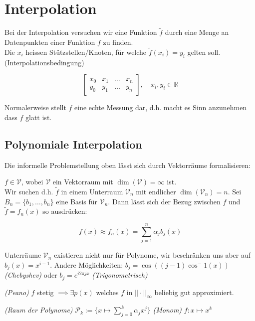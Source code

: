 \newsection
\section{Interpolation}
Bei der Interpolation versuchen wir eine Funktion $\tilde{f}$ durch eine Menge an Datenpunkten einer Funktion $f$ zu finden.\\
Die $x_i$ heissen Stützstellen/Knoten, für welche $\tilde{f}(x_i) = y_i$ gelten soll. (Interpolationsbedingung)

$$ 
\begin{bmatrix}
    x_0 & x_1 & \ldots & x_n \\
    y_0 & y_1 & \ldots & y_n    
\end{bmatrix},
\quad x_i, y_i \in \mathbb{R}
$$

Normalerweise stellt $f$ eine echte Messung dar, d.h. macht es Sinn anzunehmen dass $f$ glatt ist.

\subsection{Polynomiale Interpolation}

Die informelle Problemstellung oben lässt sich durch Vektorräume formalisieren:

$f \in \mathcal{V}$, wobei $\mathcal{V}$ ein Vektorraum mit $\dim(\mathcal{V}) = \infty$ ist. \\
Wir suchen d.h. $\tilde{f}$ in einem Unterraum $\mathcal{V}_n$ mit endlicher $\dim(\mathcal{V}_n) = n$.
Sei $B_n = \{b_1,\ldots,b_n\}$ eine Basis für $\mathcal{V}_n$. 
Dann lässt sich der Bezug zwischen $f$ und $\tilde{f} = f_n(x)$ so ausdrücken:

$$f(x) \approx f_n(x) = \sum_{j=1}^n \alpha_j b_j(x)$$

\setcounter{all}{2}
\inlineremark Unterräume $\mathcal{V}_n$ existieren nicht nur für Polynome, wir beschränken uns aber auf $b_j(x) = x^{i-1}$.
Andere Möglichkeiten: $b_j = \cos((j-1)\cos^-1(x))$ \textit{(Chebyshev)} oder $b_j = e^{i2\pi j x}$ \textit{(Trigonometrisch)}


\setcounter{all}{5}
\inlinetheorem \textit{(Peano)} $f$ stetig $\implies \exists p(x)$ welches $f$ in $||\cdot||_\infty$ beliebig gut approximiert.

\setcounter{all}{7}
\inlinedef \textit{(Raum der Polynome)} $\mathcal{P}_k := \{ x \mapsto \sum_{j = 0}^{k} \alpha_j x^j \}$ \inlinedef \textit{(Monom)} $f: x \mapsto x^k$

